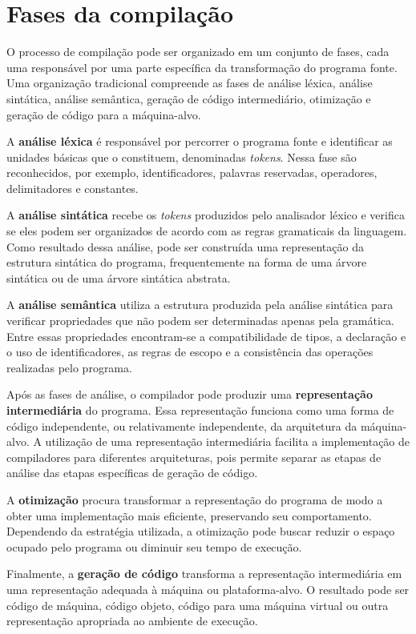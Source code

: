 \documentclass[
  brazilian,
  letterpaper,
]{book}
\theoremstyle{plain}
\theoremstyle{definition}
\theoremstyle{remark}
\begin{document}
\section{Fases da compilação}\label{fases-da-compilauxe7uxe3o}

O processo de compilação pode ser organizado em um conjunto de fases,
cada uma responsável por uma parte específica da transformação do
programa fonte. Uma organização tradicional compreende as fases de
análise léxica, análise sintática, análise semântica, geração de código
intermediário, otimização e geração de código para a máquina-alvo.

A \textbf{análise léxica} é responsável por percorrer o programa fonte e
identificar as unidades básicas que o constituem, denominadas
\emph{tokens}. Nessa fase são reconhecidos, por exemplo,
identificadores, palavras reservadas, operadores, delimitadores e
constantes.

A \textbf{análise sintática} recebe os \emph{tokens} produzidos pelo
analisador léxico e verifica se eles podem ser organizados de acordo com
as regras gramaticais da linguagem. Como resultado dessa análise, pode
ser construída uma representação da estrutura sintática do programa,
frequentemente na forma de uma árvore sintática ou de uma árvore
sintática abstrata.

A \textbf{análise semântica} utiliza a estrutura produzida pela análise
sintática para verificar propriedades que não podem ser determinadas
apenas pela gramática. Entre essas propriedades encontram-se a
compatibilidade de tipos, a declaração e o uso de identificadores, as
regras de escopo e a consistência das operações realizadas pelo
programa.

Após as fases de análise, o compilador pode produzir uma
\textbf{representação intermediária} do programa. Essa representação
funciona como uma forma de código independente, ou relativamente
independente, da arquitetura da máquina-alvo. A utilização de uma
representação intermediária facilita a implementação de compiladores
para diferentes arquiteturas, pois permite separar as etapas de análise
das etapas específicas de geração de código.

A \textbf{otimização} procura transformar a representação do programa de
modo a obter uma implementação mais eficiente, preservando seu
comportamento. Dependendo da estratégia utilizada, a otimização pode
buscar reduzir o espaço ocupado pelo programa ou diminuir seu tempo de
execução.

Finalmente, a \textbf{geração de código} transforma a representação
intermediária em uma representação adequada à máquina ou
plataforma-alvo. O resultado pode ser código de máquina, código objeto,
código para uma máquina virtual ou outra representação apropriada ao
ambiente de execução.
\end{document}
